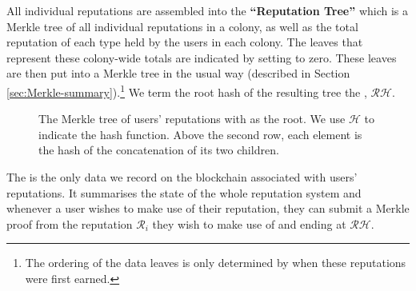 All individual reputations are assembled into the \textbf{``Reputation Tree''} which is a Merkle tree of all individual reputations in a colony, as well as the total reputation of each type held by the users in each colony. The leaves that represent these colony-wide totals are indicated by setting  to zero. These leaves are then put into a Merkle tree in the usual way (described in Section \ref{sec:Merkle-summary}).\footnote{The ordering of the data leaves is only determined by when these reputations were first earned.} We term the root hash of the resulting tree the , $\mathcal{RH}$.
\begin{figure}
\centering
{}
\caption{The Merkle tree of users' reputations with  as the root. We use $\mathcal{H}$ to indicate the  hash function. Above the second row, each element is the hash of the concatenation of its two children.}
\end{figure}


The  is the only data we record on the blockchain associated with users' reputations. It summarises the state of the whole reputation system and whenever a user wishes to make use of their reputation, they can submit a Merkle proof from the reputation $\mathcal{R}_i$ they wish to make use of and ending at $\mathcal{RH}$.

